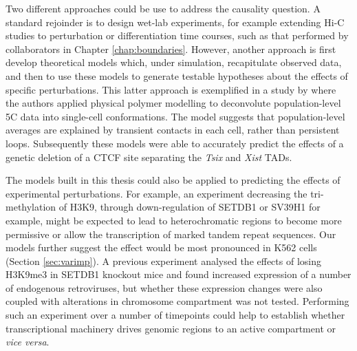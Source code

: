 \documentclass[a4paper,11pt,oneside]{book}
\begin{document}

Two different approaches could be use to address the causality question. A standard rejoinder is to design wet-lab experiments, for example extending Hi-C studies to perturbation or differentiation time courses, such as that performed by collaborators in Chapter \ref{chap:boundaries}. However, another approach is first develop theoretical models which, under simulation, recapitulate observed data, and then to use these models to generate testable hypotheses about the effects of specific perturbations. This latter approach is exemplified in a study by \citet{Giorgetti2014a} where the authors applied physical polymer modelling to deconvolute population-level 5C data into single-cell conformations. The model suggests that population-level averages are explained by transient contacts in each cell, rather than persistent loops. Subsequently these models were able to accurately predict the effects of a genetic deletion of a CTCF site separating the \emph{Tsix} and \emph{Xist} TADs.\cite{Giorgetti2014a} 

The models built in this thesis could also be applied to predicting the effects of experimental perturbations. For example, an experiment decreasing the tri-methylation of H3K9, through down-regulation of SETDB1 or SV39H1 for example, might be expected to lead to heterochromatic regions to become more permissive or allow the transcription of marked tandem repeat sequences.\cite{Kim2012}  Our models further suggest the effect would be most pronounced in K562 cells (Section \ref{sec:varimp}). A previous experiment analysed the effects of losing H3K9me3 in SETDB1 knockout mice and found increased expression of a number of endogenous retroviruses,\cite{Karimi2011} but whether these expression changes were also coupled with alterations in chromosome compartment was not tested. Performing such an experiment over a number of timepoints could help to establish whether transcriptional machinery drives genomic regions to an active compartment or \emph{vice versa}.
\end{document}

